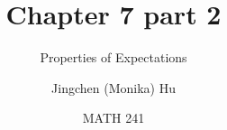 \documentclass[slidestop,compress,mathserif]{beamer}
\title[Chapter 7 part 2]{Chapter 7 part 2}
\subtitle{Properties of Expectations}
\author[Jingchen (Monika) Hu] %
{Jingchen (Monika) Hu}
\institute[Vassar] %
{Vassar College}
\date[MATH 241] %
{MATH 241}
\begin{document}




\begin{frame}%
\titlepage
\end{frame}


%
%
%
%
%
%
%
%
%
%
%
\end{document}
